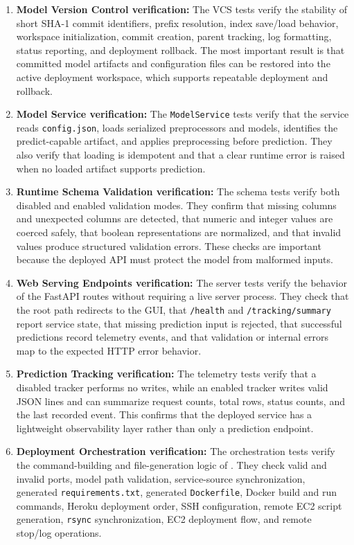 \begin{enumerate}[leftmargin=*]
  \item \textbf{Model Version Control verification:}
  The VCS tests verify the stability of short SHA-1 commit identifiers, prefix
  resolution, index save/load behavior, workspace initialization, commit
  creation, parent tracking, log formatting, status reporting, and deployment
  rollback. The most important result is that committed model artifacts and
  configuration files can be restored into the active deployment workspace,
  which supports repeatable deployment and rollback.

  \item \textbf{Model Service verification:}
  The \texttt{ModelService} tests verify that the service reads
  \texttt{config.json}, loads serialized preprocessors and models, identifies
  the predict-capable artifact, and applies preprocessing before prediction.
  They also verify that loading is idempotent and that a clear runtime error is
  raised when no loaded artifact supports prediction.

  \item \textbf{Runtime Schema Validation verification:}
  The schema tests verify both disabled and enabled validation modes. They
  confirm that missing columns and unexpected columns are detected, that numeric
  and integer values are coerced safely, that boolean representations are
  normalized, and that invalid values produce structured validation errors.
  These checks are important because the deployed API must protect the model
  from malformed inputs.

  \item \textbf{Web Serving Endpoints verification:}
  The server tests verify the behavior of the FastAPI routes without requiring
  a live server process. They check that the root path redirects to the GUI,
  that \texttt{/health} and \texttt{/tracking/summary} report service state,
  that missing prediction input is rejected, that successful predictions record
  telemetry events, and that validation or internal errors map to the expected
  HTTP error behavior.

  \item \textbf{Prediction Tracking verification:}
  The telemetry tests verify that a disabled tracker performs no writes, while
  an enabled tracker writes valid JSON lines and can summarize request counts,
  total rows, status counts, and the last recorded event. This confirms that
  the deployed service has a lightweight observability layer rather than only a
  prediction endpoint.

  \item \textbf{Deployment Orchestration verification:}
  The orchestration tests verify the command-building and file-generation logic
  of . They check valid and invalid ports, model path
  validation, service-source synchronization, generated \texttt{requirements.txt},
  generated \texttt{Dockerfile}, Docker build and run commands, Heroku
  deployment order, SSH configuration, remote EC2 script generation,
  \texttt{rsync} synchronization, EC2 deployment flow, and remote stop/log
  operations.
\end{enumerate}


